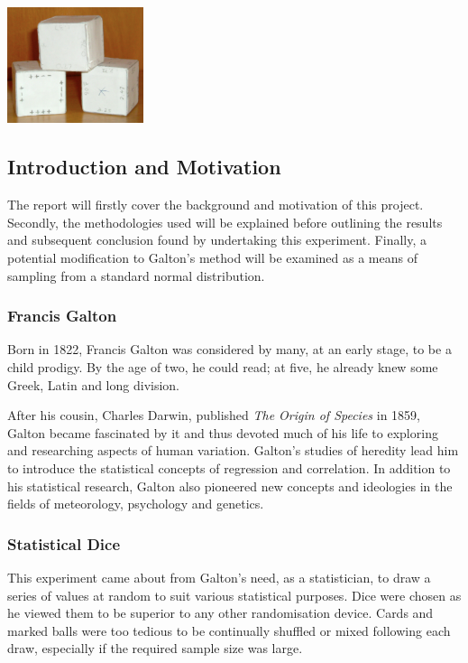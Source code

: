 \begin{center}
\includegraphics[width=4cm]{figures/GaltonDice.pdf}
\end{center}

\subsection{Introduction and Motivation}
The report will firstly cover the background and motivation of this project. Secondly, the methodologies used will be explained before outlining the results and subsequent conclusion found by undertaking this experiment. Finally, a potential modification to Galton's method will be examined as a means of sampling from a standard normal distribution.  

\subsubsection*{Francis Galton}
Born in 1822, Francis Galton was considered by many, at an early stage, to be a child prodigy. By the age of two, he could read; at five, he already knew some Greek, Latin and long division.

After his cousin, Charles Darwin, published \textit{The Origin of Species} in 1859, Galton became fascinated by it and thus devoted much of his life to exploring and researching aspects of human variation. Galton's studies of heredity lead him to introduce the statistical concepts of regression and correlation. In addition to his statistical research, Galton also pioneered new concepts and ideologies in the fields of meteorology, psychology and genetics.  

\subsubsection*{Statistical Dice}
This experiment came about from Galton's need, as a statistician, to draw a series of values at random to suit various statistical purposes. Dice were chosen as he viewed them to be superior to any other randomisation device. Cards and marked balls were too tedious to be continually shuffled or mixed following each draw, especially if the required sample size was large. 

